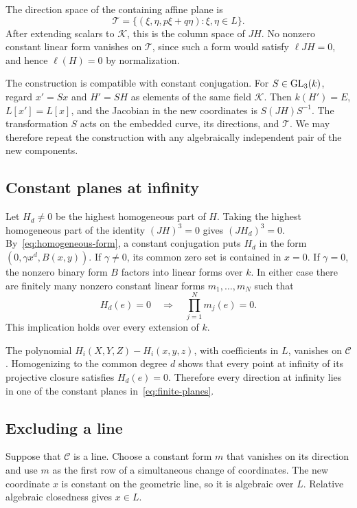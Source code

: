 The direction space of the containing affine plane is
\begin{equation}\label{eq:tangent-plane}
 \mathcal T=\{(\xi,\eta,p\xi+q\eta):\xi,\eta\in L\}.
\end{equation}
After extending scalars to $\mathcal K$, this is the column space of $JH$. No nonzero constant linear form vanishes on $\mathcal T$, since such a form would satisfy $\ell JH=0$, and hence $\ell(H)=0$ by normalization.

The construction is compatible with constant conjugation. For $S\in\operatorname{GL}_3(k)$, regard $x'=Sx$ and $H'=SH$ as elements of the same field $\mathcal K$. Then $k(H')=E$, $L[x']=L[x]$, and the Jacobian in the new coordinates is $S(JH)S^{-1}$. The transformation $S$ acts on the embedded curve, its directions, and $\mathcal T$. We may therefore repeat the construction with any algebraically independent pair of the new components.

\subsection{Constant planes at infinity}
Let $H_d\neq0$ be the highest homogeneous part of $H$. Taking the highest homogeneous part of the identity $(JH)^3=0$ gives $(JH_d)^3=0$. By~\eqref{eq:homogeneous-form}, a constant conjugation puts $H_d$ in the form $(0,\gamma x^d,B(x,y))$. If $\gamma\neq0$, its common zero set is contained in $x=0$. If $\gamma=0$, the nonzero binary form $B$ factors into linear forms over $k$. In either case there are finitely many nonzero constant linear forms $m_1,\ldots,m_N$ such that
\begin{equation}\label{eq:finite-planes}
 H_d(e)=0\quad\Longrightarrow\quad\prod_{j=1}^N m_j(e)=0.
\end{equation}
This implication holds over every extension of $k$.

The polynomial $H_i(X,Y,Z)-H_i(x,y,z)$, with coefficients in $L$, vanishes on $\mathcal C$. Homogenizing to the common degree $d$ shows that every point at infinity of its projective closure satisfies $H_d(e)=0$. Therefore every direction at infinity lies in one of the constant planes in~\eqref{eq:finite-planes}.

\subsection{Excluding a line}
Suppose that $\mathcal C$ is a line. Choose a constant form $m$ that vanishes on its direction and use $m$ as the first row of a simultaneous change of coordinates. The new coordinate $x$ is constant on the geometric line, so it is algebraic over $L$. Relative algebraic closedness gives $x\in L$.

